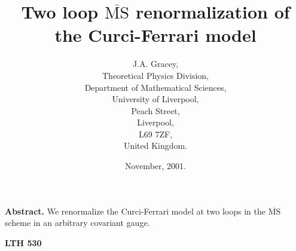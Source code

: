 \documentclass[a4paper,11pt]{article}
\newcommand{\MSbar}{\overline{\mbox{MS}}}
\begin{document}
\title{Two loop $\MSbar$ renormalization of the Curci-Ferrari model} 
\author{J.A. Gracey, \\ Theoretical Physics Division, \\ Department 
of Mathematical Sciences, \\ University of Liverpool, \\ Peach Street, \\ 
Liverpool, \\ L69 7ZF, \\ United Kingdom.} 
\date{November, 2001.} 
\maketitle 
\vspace{5cm} 
\noindent 
{\bf Abstract.} We renormalize the Curci-Ferrari model at two loops in the 
$\MSbar$ scheme in an arbitrary covariant gauge. 

\vspace{-16cm} 
\hspace{13.5cm} 
{\bf LTH 530} 
\end{document}
